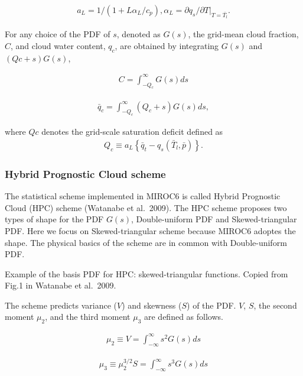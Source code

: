 \begin{eqnarray}
a_{L}=1 /\left(1+L \alpha_{L} / c_{p}\right), \alpha_{L}=\partial q_{s} /\left.\partial T\right|_{T=\bar{T_l}}.
\end{eqnarray}

For any choice of the PDF of \(s\), denoted as \(G(s)\), the grid-mean cloud fraction, \(C\), and cloud water content, \(q_c\), are obtained by integrating \(G(s)\) and \((Qc + s)G(s)\),

\begin{eqnarray}
C=\int_{-Q_{c}}^{\infty}G(s)ds
\end{eqnarray}

\begin{eqnarray}
\bar{q}_{c}=\int_{-Q_{c}}^{\infty}\left(Q_{c}+s\right)G(s)ds,
\end{eqnarray}

where \(Qc\) denotes the grid-scale saturation deficit defined as \begin{eqnarray}
Q_{c} \equiv a_{L}\left\{\bar{q}_{t}-q_{s}\left(\bar{T}_{l}, \bar{p}\right)\right\}.
\end{eqnarray}

\hypertarget{hybrid-prognostic-cloud-scheme}{%
\subsubsection{Hybrid Prognostic Cloud scheme}\label{hybrid-prognostic-cloud-scheme}}

The statistical scheme implemented in MIROC6 is called Hybrid Prognostic Cloud (HPC) scheme (Watanabe et al.~2009). The HPC scheme proposes two types of shape for the PDF \(G(s)\), Double-uniform PDF
and Skewed-triangular PDF. Here we focus on Skewed-triangular scheme because MIROC6 adoptes the shape. The physical basics of the scheme are in common with Double-uniform PDF.

Example of the basis PDF for HPC: skewed-triangular functions. Copied from Fig.1 in Watanabe et al.~2009.

The scheme predicts variance (\(V\)) and skewness (\(S\)) of the PDF. \(V\), \(S\), the second moment \(\mu_2\), and the third moment \(\mu_3\) are defined as follows.

\begin{eqnarray}
\mu_{2} \equiv V=\int_{-\infty}^{\infty} s^{2} G(s) ds
\end{eqnarray}

\begin{eqnarray}
\mu_{3} \equiv \mu_{2}^{3 / 2} S=\int_{-\infty}^{\infty} s^{3} G(s) d s
\end{eqnarray}

